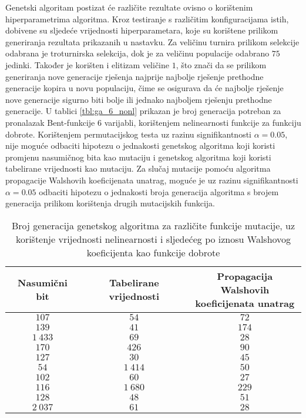 Genetski algoritam postizat će različite rezultate ovisno o korištenim hiperparametrima algoritma.
Kroz testiranje s različitim konfiguracijama istih, dobivene su sljedeće vrijednosti hiperparametara, koje su korištene prilikom generiranja rezultata prikazanih u nastavku.
Za veličinu turnira prilikom selekcije odabrana je troturnirska selekcija, dok je za veličinu populacije odabrano $75$ jedinki.
Također je korišten i elitizam veličine $1$, što znači da se prilikom generiranja nove generacije rješenja najprije najbolje rješenje prethodne generacije kopira u novu populaciju, čime se osigurava da će najbolje rješenje nove generacije sigurno biti bolje ili jednako najboljem rješenju prethodne generacije.
U tablici \ref{tbl:ga_6_nonl} prikazan je broj generacija potreban za pronalazak Bent-funkcije $6$ varijabli, korištenjem nelinearnosti funkcije za funkciju dobrote.
Korištenjem permutacijskog testa uz razinu signifikantnosti $\alpha = 0.05$, nije moguće odbaciti hipotezu o jednakosti genetskog algoritma koji koristi promjenu nasumičnog bita kao mutaciju i genetskog algoritma koji koristi tabelirane vrijednosti kao mutaciju.
Za slučaj mutacije pomoću algoritma propagacije Walshovih koeficijenata unatrag, moguće je uz razinu signifikantnosti $\alpha = 0.05$ odbaciti hipotezu o jednakosti broja generacija algoritma s brojem generacija prilikom korištenja drugih mutacijskih funkcija.

\begin{table}[]
    \centering
    \begin{tabular}{ccc}
        Nasumični bit & Tabelirane vrijednosti & \makecell{Propagacija Walshovih \\ koeficijenata unatrag} \\ \hline
           $107$ &     $54$ &  $72$ \\
           $139$ &     $41$ & $174$ \\
        $1\:433$ &     $69$ &  $28$ \\
           $170$ &    $426$ &  $90$ \\
           $127$ &     $30$ &  $45$ \\
            $54$ & $1\:414$ &  $50$ \\
           $102$ &     $60$ &  $27$ \\
           $116$ & $1\:680$ & $229$ \\
           $128$ &     $48$ &  $51$ \\
        $2\:037$ &     $61$ &  $28$
    \end{tabular}
    \captionsetup{justification=centering}
    \caption{Broj generacija genetskog algoritma za različite funkcije mutacije, uz korištenje vrijednosti nelinearnosti i sljedećeg po iznosu Walshovog koeficijenta kao funkcije dobrote}
    \label{tbl:ga_6_nonlV2}
\end{table}

